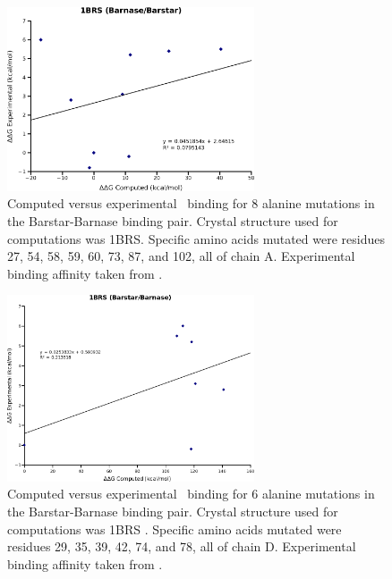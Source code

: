 \begin{figure}[H]
  \centering
  \includegraphics[width=0.65\textwidth]{figures/1brs_barnase_barstar.png}
  \caption{
Computed versus experimental \ddg\ binding for 8 alanine mutations in the Barstar-Barnase binding pair.
Crystal structure used for computations was 1BRS.
Specific amino acids mutated were residues 27, 54, 58, 59, 60, 73, 87, and 102, all of chain A.
Experimental binding affinity taken from \protect\cite{thorn2001asedb}.
            }
\end{figure}

\begin{figure}[H]
  \centering
  \includegraphics[width=0.65\textwidth]{figures/1brs_barstar_barnase.png}
  \caption{
Computed versus experimental \ddg\ binding for 6 alanine mutations in the Barstar-Barnase binding pair.
Crystal structure used for computations was 1BRS \protect\cite{buckle1994protein}.
Specific amino acids mutated were residues 29, 35, 39, 42, 74, and 78, all of chain D.
Experimental binding affinity taken from \protect\cite{thorn2001asedb}.
            }
\end{figure}

